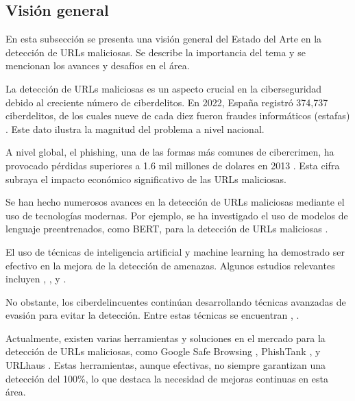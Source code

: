 \subsection{Visión general}

En esta subsección se presenta una visión general del Estado del Arte en la detección de URLs maliciosas. Se describe la importancia del tema y se mencionan los avances y desafíos en el área.

La detección de URLs maliciosas es un aspecto crucial en la ciberseguridad debido al creciente número de ciberdelitos. En 2022, España registró 374,737 ciberdelitos, de los cuales nueve de cada diez fueron fraudes informáticos (estafas) \autocite{acosta2023espana}. Este dato ilustra la magnitud del problema a nivel nacional.

A nivel global, el phishing, una de las formas más comunes de cibercrimen, ha provocado pérdidas superiores a 1.6 mil millones de dolares en 2013 \autocite{konradt2016phishing}. Esta cifra subraya el impacto económico significativo de las URLs maliciosas.

Se han hecho numerosos avances en la detección de URLs maliciosas mediante el uso de tecnologías modernas. Por ejemplo, se ha investigado el uso de modelos de lenguaje preentrenados, como BERT, para la detección de URLs maliciosas \autocite{liu2023malicious}.

El uso de técnicas de inteligencia artificial y machine learning ha demostrado ser efectivo en la mejora de la detección de amenazas. Algunos estudios relevantes incluyen \autocite{bigdata2013}, \autocite{le2018urlnet}, y \autocite{sahoo2017survey}.

No obstante, los ciberdelincuentes continúan desarrollando técnicas avanzadas de evasión para evitar la detección. Entre estas técnicas se encuentran \autocite{tavares2024evasion}, \autocite{defenseevasion}.

Actualmente, existen varias herramientas y soluciones en el mercado para la detección de URLs maliciosas, como Google Safe Browsing \autocite{googlesafebrowsing}, PhishTank \autocite{phishtank}, y URLhaus \autocite{urlhaus}. Estas herramientas, aunque efectivas, no siempre garantizan una detección del 100\%, lo que destaca la necesidad de mejoras continuas en esta área.
